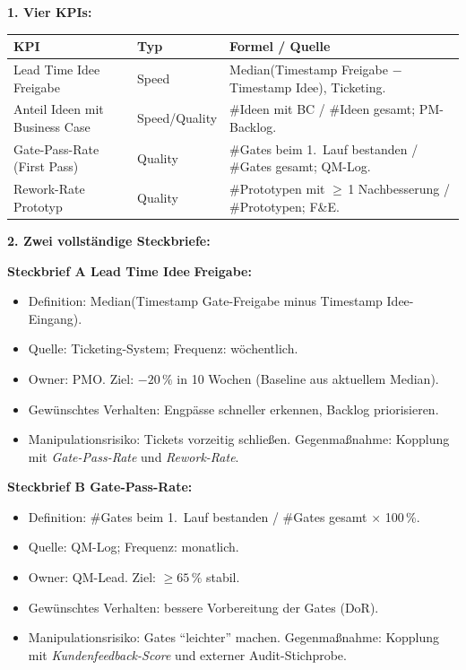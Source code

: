 \documentclass[11pt,a4paper,oneside]{article}
\begin{document}
\begin{loesungbox}
\textbf{1. Vier KPIs:}

\begin{tabularx}{\linewidth}{@{}p{4.4cm}lX@{}}
\toprule
\textbf{KPI} & \textbf{Typ} & \textbf{Formel / Quelle} \\
\midrule
Lead Time Idee\,\textrightarrow{}\,Freigabe & Speed & Median(Timestamp Freigabe $-$ Timestamp Idee), Ticketing. \\
Anteil Ideen mit Business Case & Speed/Quality & \#Ideen mit BC / \#Ideen gesamt; PM-Backlog. \\
Gate-Pass-Rate (First Pass) & Quality & \#Gates beim 1.\ Lauf bestanden / \#Gates gesamt; QM-Log. \\
Rework-Rate Prototyp & Quality & \#Prototypen mit $\geq$\,1 Nachbesserung / \#Prototypen; F\&E. \\
\bottomrule
\end{tabularx}

\smallskip
\textbf{2. Zwei vollst\"andige Steckbriefe:}

\smallskip
\textbf{Steckbrief A \textendash{} Lead Time Idee\,\textrightarrow{}\,Freigabe:}
\begin{itemize}
  \item Definition: Median(Timestamp Gate-Freigabe minus Timestamp Idee-Eingang).
  \item Quelle: Ticketing-System; Frequenz: w\"ochentlich.
  \item Owner: PMO. Ziel: $-20\,\%$ in 10 Wochen (Baseline aus aktuellem Median).
  \item Gew\"unschtes Verhalten: Engp\"asse schneller erkennen, Backlog priorisieren.
  \item Manipulationsrisiko: Tickets vorzeitig schlie{\ss}en. Gegenma{\ss}nahme: Kopplung mit \emph{Gate-Pass-Rate} und \emph{Rework-Rate}.
\end{itemize}

\smallskip
\textbf{Steckbrief B \textendash{} Gate-Pass-Rate:}
\begin{itemize}
  \item Definition: \#Gates beim 1.\ Lauf bestanden / \#Gates gesamt $\times$ 100\,\%.
  \item Quelle: QM-Log; Frequenz: monatlich.
  \item Owner: QM-Lead. Ziel: $\geq 65\,\%$ stabil.
  \item Gew\"unschtes Verhalten: bessere Vorbereitung der Gates (DoR).
  \item Manipulationsrisiko: Gates ``leichter'' machen. Gegenma{\ss}nahme: Kopplung mit \emph{Kundenfeedback-Score} und externer Audit-Stichprobe.
\end{itemize}


\end{loesungbox}
\end{document}
